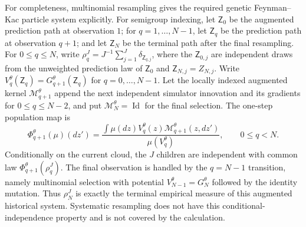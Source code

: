 For completeness, multinomial resampling gives the required genetic
Feynman--Kac particle system explicitly.  For semigroup indexing, let
$\mathsf Z_0$ be the augmented prediction path at observation $1$; for
$q=1,\ldots,N-1$, let $\mathsf Z_q$ be the prediction path at observation
$q+1$; and let $\mathsf Z_N$ be the terminal path after the final resampling.
For $0\leq q\leq N$, write
$\rho_q^J=J^{-1}\sum_{j=1}^J\delta_{\mathsf Z_{q,j}}$, where the
$\mathsf Z_{0,j}$ are independent draws from the unweighted prediction law of
$\mathsf Z_0$ and $\mathsf Z_{N,j}=Z_{N,j}$.
Write $V_q^\theta(\mathsf Z_q)=G_{q+1}^\theta(\mathsf Z_q)$ for
$q=0,\ldots,N-1$.  Let the locally indexed augmented kernel
$\mathcal M_{q+1}^\theta$ append the next independent simulator innovation and
its gradients for $0\leq q\leq N-2$, and put
$\mathcal M_N^\theta=\operatorname{Id}$ for the final selection.  The one-step
population map is
\begin{equation}
\Phi_{q+1}^\theta(\mu)(dz')
=\frac{\int\mu(dz)V_q^\theta(z)\mathcal M_{q+1}^\theta(z,dz')}
       {\mu(V_q^\theta)},\qquad 0\leq q<N.                    \label{eq:s2-fk-update}
\end{equation}
Conditionally on the current cloud, the $J$ children are independent with
common law $\Phi_{q+1}^\theta(\rho_q^J)$.  The final observation is handled by
the $q=N-1$ transition, namely multinomial selection with potential
$V_{N-1}^\theta=G_N^\theta$ followed by the identity mutation.  Thus
$\rho_N^J$ is exactly the terminal empirical measure of this augmented
historical system.  Systematic resampling does not have this
conditional-independence property and is not covered by the calculation.

